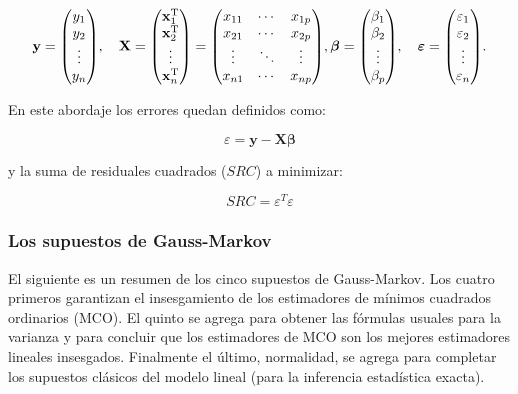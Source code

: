 $$\mathbf {y} ={\begin{pmatrix}y_{1}\\y_{2}\\\vdots \\y_{n}\end{pmatrix}},\quad 
\mathbf {X} ={\begin{pmatrix}\mathbf {x} _{1}^{\rm {T}}\\\mathbf {x} _{2}^{\rm {T}}\\\vdots \\\mathbf {x} _{n}^{\rm {T}}\end{pmatrix}}={\begin{pmatrix}x_{11}&\cdots &x_{1p}\\x_{21}&\cdots &x_{2p}\\\vdots &\ddots &\vdots \\x_{n1}&\cdots &x_{np}\end{pmatrix}},
{\boldsymbol {\beta }}={\begin{pmatrix}\beta _{1}\\\beta _{2}\\\vdots \\\beta _{p}\end{pmatrix}},\quad {\boldsymbol {\varepsilon }}={\begin{pmatrix}\varepsilon _{1}\\\varepsilon _{2}\\\vdots \\\varepsilon _{n}\end{pmatrix}}.$$

En este abordaje los errores quedan definidos como: 

$$\varepsilon = \mathbf {y} - \mathbf {X} {\boldsymbol {\beta }}$$

y la suma de residuales cuadrados ($SRC$) a minimizar:

$$SRC = \varepsilon^{T} \varepsilon $$ 

\subsubsection{Los supuestos de Gauss-Markov} 

El siguiente es un resumen de los cinco supuestos de Gauss-Markov. Los cuatro primeros garantizan el insesgamiento de los estimadores de
mínimos cuadrados ordinarios (MCO). El quinto se agrega para obtener las fórmulas usuales para la varianza y para concluir que los estimadores de MCO son los mejores estimadores lineales insesgados. Finalmente el último, normalidad, se agrega para completar los supuestos clásicos del modelo lineal (para la inferencia estadística exacta).


